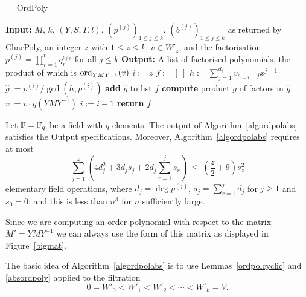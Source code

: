 \begin{algorithm}
\caption{$\quad$ \sc OrdPoly}
\label{algordpolabs}
%
\begin{algorithmic}
\STATE \textbf{Input:} $M$, $k$, $(Y,S,T,l)$, $(p^{(j)})_{1 \le j \le k}$,
$(b^{(j)})_{1 \le j \le k}$ as returned by {\sc CharPoly}, an integer
$z$ with $1 \le z \le k$,
$v \in W'_z$, and the factorisation  
$p^{(j)} = \prod_{r=1}^t q_r^{e_{j,r}}$ for all $j\leq k$
\STATE \textbf{Output:} A list of factorised polynomials, the product
of which is $\mathrm{ord}_{YMY^{-1}}(v)$ 
\vspace*{2mm}
\STATE $i := z$ \hspace*{1cm} 
\STATE $f := [\ ]$ \hspace*{1cm} 
\REPEAT
    \STATE $h := \sum_{j=1}^{d_i} v_{s_{i-1}+j} x^{j-1}$
    \STATE $\hat g := p^{(i)}/\gcd(h,p^{(i)})$ \hspace*{1cm} 
        \STATE \textbf{add} $\hat g$ to list $f$
        \STATE \textbf{compute} product $g$ of factors in $\hat g$
            \STATE $v := v \cdot g(YMY^{-1})$ \hspace*{1cm} 
        \ENDIF
    \ENDIF
    \STATE $i := i - 1$
\STATE \textbf{return} $f$
\end{algorithmic}
\end{algorithm}

\begin{Prop}
\label{propordpol}
%
Let $\mathbb{F} = \mathbb{F}_q$ be a field with $q$ elements.
The output of Algorithm~\ref{algordpolabs} satisfies the Output specifications.
Moreover, Algorithm~\ref{algordpolabs}
requires at most
\[
\sum_{j=1}^{z} 
  \left( 4 d_j^2  + 3d_j s_j + 2d_j \sum_{r=1}^j s_r \right)
\ \leq\ (\frac{z}{2}+9)s_z^2
\]
elementary field operations, 
where $d_j=\deg p^{(j)}$, $s_j=\sum_{r=1}^j d_j$ for $j\geq1$ and
$s_0=0$; and this is less than $n^3$ for $n$ sufficiently large.

\end{Prop}
\proofbeg
Since we are computing an order polynomial with respect to the matrix
$M' = YMY^{-1}$ we can always use the form of this matrix as displayed
in Figure~\ref{bigmat}.

The basic idea of Algorithm~\ref{algordpolabs} is to use
Lemmas~\ref{ordpolcyclic} and \ref{absordpoly} applied to the filtration
\[ 0 = W'_0 < W'_1 < W'_2 < \cdots < W'_k = V. \]

